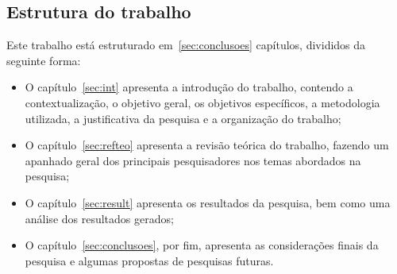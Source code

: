 \subsection{Estrutura do trabalho} \label{subsec:estrutura}
    Este trabalho está estruturado em~\ref{sec:conclusoes} capítulos, divididos da seguinte forma:
    \begin{itemize}
        \item O capítulo~\ref{sec:int} apresenta a introdução do trabalho, contendo a contextualização, o objetivo geral, os objetivos específicos, a metodologia utilizada, a justificativa da pesquisa e a organização do trabalho;
        \item O capítulo~\ref{sec:refteo} apresenta a revisão teórica do trabalho, fazendo um apanhado geral dos principais pesquisadores nos temas abordados na pesquisa;
        \item O capítulo~\ref{sec:result} apresenta os resultados da pesquisa, bem como uma análise dos resultados gerados;
        \item O capítulo~\ref{sec:conclusoes}, por fim, apresenta as considerações finais da pesquisa e algumas propostas de pesquisas futuras.
    \end{itemize}
    